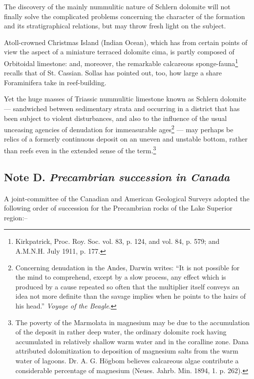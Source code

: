 \documentclass[a4paper, 12pt, oneside]{article}
\begin{document}
The discovery of the mainly nummulitic nature of Schlern dolomite will not finally solve the complicated problems concerning the character of the formation and its stratigraphical relations, but may throw fresh light on the subject.

Atoll-crowned Christmas Island (Indian Ocean), which has from certain points of view the aspect of a miniature terraced dolomite cima, is partly composed of Orbitoidal limestone: and, moreover, the remarkable calcareous sponge-fauna\footnote{Kirkpatrick, Proc. Roy. Soc. vol. 83, p. 124, and vol. 84, p. 579; and A.M.N.H. July 1911, p. 177.} recalls that of St. Cassian. Sollas has pointed out, too, how large a share Foraminifera take in reef-building.

Yet the huge masses of Triassic nummulitic limestone known as Schlern dolomite --- sandwiched between sedimentary strata and occurring in a district that has been subject to violent disturbances, and also to the influence of the usual unceasing agencies of denudation for immeasurable ages\footnote{Concerning denudation in the Andes, Darwin writes: ``It is not possible for the mind to comprehend, except by a slow process, any effect which is produced by a cause repeated so often that the multiplier itself conveys an idea not more definite than the savage implies when he points to the hairs of his head.'' \emph{Voyage of the Beagle}.} --- may perhaps be relics of a formerly continuous deposit on an uneven and unstable bottom, rather than reefs even in the extended sense of the term.\footnote{The poverty of the Marmolata in magnesium may be due to the accumulation of the deposit in rather deep water, the ordinary dolomite rock having accumulated in relatively shallow warm water and in the coralline zone. Dana attributed dolomitization to deposition of magnesium salts from the warm water of lagoons. Dr. A. G. Högbom believes calcareous algae contribute a considerable percentage of magnesium (Neues. Jahrb. Min. 1894, 1. p. 262).}

\subsection{Note D. \emph{Precambrian succession in Canada}}
\paragraph{}
A joint-committee of the Canadian and American Geological Surveys adopted the following order of succession for the Precambrian rocks of the Lake Superior region:--
\end{document}
